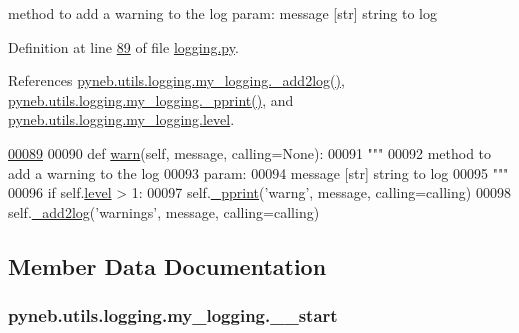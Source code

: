 \begin{DoxyVerb}method to add a warning to the log                
param:
    message [str] string to log
\end{DoxyVerb}
 

Definition at line \hyperlink{logging_8py_source_l00089}{89} of file \hyperlink{logging_8py_source}{logging.\-py}.



References \hyperlink{logging_8py_source_l00059}{pyneb.\-utils.\-logging.\-my\-\_\-logging.\-\_\-add2log()}, \hyperlink{logging_8py_source_l00051}{pyneb.\-utils.\-logging.\-my\-\_\-logging.\-\_\-pprint()}, and \hyperlink{logging_8py_source_l00041}{pyneb.\-utils.\-logging.\-my\-\_\-logging.\-level}.


\begin{DoxyCode}
\hypertarget{classpyneb_1_1utils_1_1logging_1_1my__logging_l00089}{}\hyperlink{classpyneb_1_1utils_1_1logging_1_1my__logging_aed7bf24f37fee46da46caae857bc383c}{00089} 
00090     \textcolor{keyword}{def }\hyperlink{classpyneb_1_1utils_1_1logging_1_1my__logging_aed7bf24f37fee46da46caae857bc383c}{warn}(self, message, calling=None):
00091         \textcolor{stringliteral}{"""}
00092 \textcolor{stringliteral}{        method to add a warning to the log                }
00093 \textcolor{stringliteral}{        param:}
00094 \textcolor{stringliteral}{            message [str] string to log}
00095 \textcolor{stringliteral}{        """}
00096         \textcolor{keywordflow}{if} self.\hyperlink{classpyneb_1_1utils_1_1logging_1_1my__logging_aa70215328c3f7a97a607c584026e144a}{level} > 1:
00097             self.\hyperlink{classpyneb_1_1utils_1_1logging_1_1my__logging_a8f54e897998e958e5e211eb11fa02c4a}{\_pprint}(\textcolor{stringliteral}{'warng'}, message, calling=calling)
00098         self.\hyperlink{classpyneb_1_1utils_1_1logging_1_1my__logging_a8de4d2383bfa53411876a066e1bf72de}{\_add2log}(\textcolor{stringliteral}{'warnings'}, message, calling=calling)
        
\end{DoxyCode}


\subsection{Member Data Documentation}
\hypertarget{classpyneb_1_1utils_1_1logging_1_1my__logging_af75641557adadbef4e010a5c0b9f9513}{
\subsubsection[{\-\_\-\-\_\-start}]{\setlength{\rightskip}{0pt plus 5cm}pyneb.\-utils.\-logging.\-my\-\_\-logging.\-\_\-\-\_\-start\hspace{0.3cm}{\ttfamily [private]}}}\label{classpyneb_1_1utils_1_1logging_1_1my__logging_af75641557adadbef4e010a5c0b9f9513}


